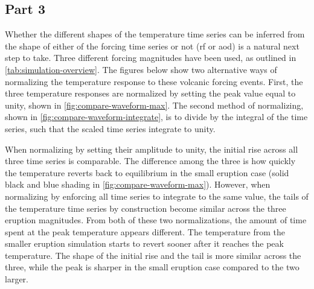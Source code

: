 \documentclass{ametsocV5}
\begin{document}
%

\subsection{Part 3}

Whether the different shapes of the temperature time series can be inferred from the
shape of either of the forcing time series or not (\ac{rf} or \ac{aod}) is a natural
next step to take. Three different forcing magnitudes have been used, as outlined in
\cref{tab:simulation-overview}. The figures below show two alternative ways of
normalizing the temperature response to these volcanic forcing events. First, the three
temperature responses are normalized by setting the peak value equal to unity, shown in
\cref{fig:compare-waveform-max}. The second method of normalizing, shown in
\cref{fig:compare-waveform-integrate}, is to divide by the integral of the time series,
such that the scaled time series integrate to unity.

When normalizing by setting their amplitude to unity, the initial rise across all three
time series is comparable. The difference among the three is how quickly the temperature
reverts back to equilibrium in the small eruption case (solid black and blue shading in
\cref{fig:compare-waveform-max}). However, when normalizing by enforcing all time series
to integrate to the same value, the tails of the temperature time series by construction
become similar across the three eruption magnitudes. From both of these two
normalizations, the amount of time spent at the peak temperature appears different. The
temperature from the smaller eruption simulation starts to revert sooner after it
reaches the peak temperature. The shape of the initial rise and the tail is more similar
across the three, while the peak is sharper in the small eruption case compared to the
two larger.

\end{document}
